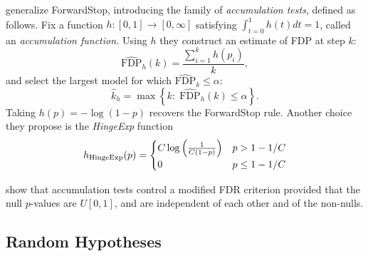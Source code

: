 \documentclass{article}
\begin{document}
\citet{li2015accumulation} generalize ForwardStop, introducing the family of {\em accumulation tests}, defined as follows.
Fix a function $h: [0,1] \rightarrow [0,\infty]$ satisfying $\int_{t=0}^1 h(t)dt=1$, called an {\em accumulation function.} Using $h$ they construct an estimate of FDP at step $k$:
\begin{equation}
\widehat{\text{FDP}}_h(k)= \frac{\sum_{i=1}^k h(p_i)}{k},
\end{equation}
and select the largest model for which $\widehat{\text{FDP}}_k \leq \alpha$:
\begin{equation}
\hat k_h=\max \left\{k:\; \widehat{\text{FDP}}_h(k) \leq \alpha \right\}.
\end{equation}
Taking $h(p)=-\log(1-p)$ recovers the ForwardStop rule. Another choice they propose is the {\em HingeExp} function
\begin{equation}
  h_{\rm HingeExp}(p)= 
  \begin{cases} 
    C\log\left(\frac{1}{C(1-p)} \right)& p> 1-1/C\\
    0 & p\leq 1-1/C
  \end{cases}
\end{equation}

\citet{li2015accumulation} show that accumulation tests control a modified FDR criterion provided that the null $p$-values are $U[0,1]$, and are independent of each other and of the non-nulls.

\subsection{Random Hypotheses}
\end{document}
